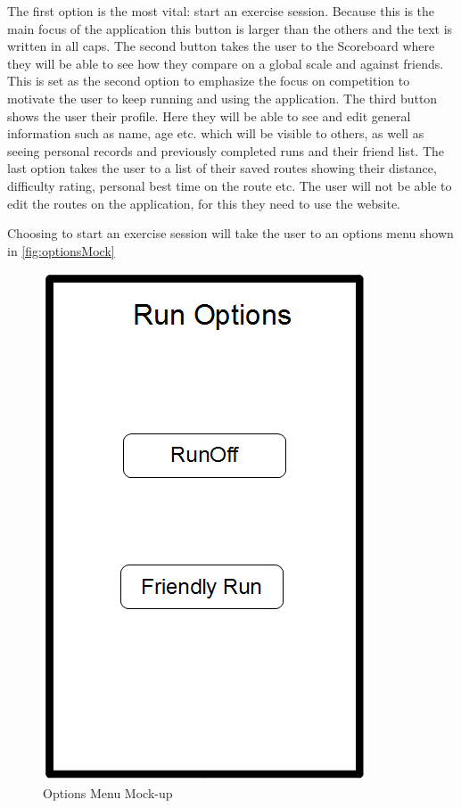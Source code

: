 The first option is the most vital: start an exercise session. Because this is the main focus of the application this button is larger than the others and the text is written in all caps. The second button takes the user to the Scoreboard where they will be able to see how they compare on a global scale and against friends. This is set as the second option to emphasize the focus on competition to motivate the user to keep running and using the application. The third button shows the user their profile. Here they will be able to see and edit general information such as name, age etc. which will be visible to others, as well as seeing personal records and previously completed runs and their friend list. The last option takes the user to a list of their saved routes showing their distance, difficulty rating, personal best time on the route etc. The user will not be able to edit the routes on the application, for this they need to use the website.
\vspace{10pt}

Choosing to start an exercise session will take the user to an options menu shown in \autoref{fig:optionsMock}

\begin{figure}[ht]
\begin{center}
 \includegraphics[scale=0.4]{img/optionsMock.png}
 \caption{Options Menu Mock-up}
 \label{fig:optionsMock}
\end{center}
\end{figure}


